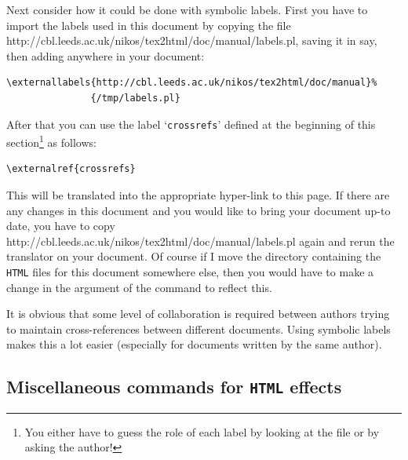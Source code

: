 \html{\\}%
Next consider how it could be done with symbolic labels. 
First you have to import the labels used in this document 
by copying the file 
{http://cbl.leeds.ac.uk/nikos/tex2html/doc/manual/labels.pl},
saving it in  say,
then adding anywhere in your document:
\begin{small}
\begin{verbatim}
\externallabels{http://cbl.leeds.ac.uk/nikos/tex2html/doc/manual}%
               {/tmp/labels.pl}
\end{verbatim}
\end{small}
After that you can use the label `\texttt{crossrefs}' defined at the beginning of this 
section\footnote{You either have to guess the role of each label by
looking at the  file or by asking the author!} as follows:
\begin{small}
\begin{verbatim}
\externalref{crossrefs}
\end{verbatim}
\end{small}
This will be translated into the appropriate hyper-link to this page.
If there are any changes in this document and you would like to
bring your document up-to date, you have to copy 
%
{http://cbl.leeds.ac.uk/nikos/tex2html/doc/manual/labels.pl} again
and rerun the translator on your document. Of course if I move the 
directory containing the \texttt{HTML} files for this document somewhere else, 
then you would have to make a change in the argument of the 
 command to reflect this. 

%
It is obvious that some level of collaboration is required between
authors trying to maintain cross-references between different documents. 
Using symbolic labels makes this a lot easier 
(especially for documents written by the same author).



\subsection{Miscellaneous commands for \texttt{HTML} effects\label{misceffects}}%
\tableofchildlinks*
{}%

